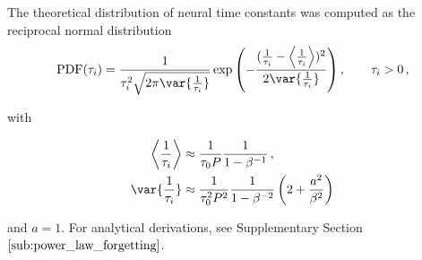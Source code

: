 The theoretical distribution of neural time constants was computed as the reciprocal normal distribution
\begin{equation}
  \text{PDF}(\tau_i) = \frac{1}{\tau_i^2 \sqrt{2\pi \var{\frac{1}{\tau_i}}}} \exp\left( -\frac{(\frac{1}{\tau_i} - \left<\frac{1}{\tau_i}\right>)^2}{2\var{\frac{1}{\tau_i}}} \right), \qquad \tau_i > 0 \,,
\end{equation}

with

\begin{equation}
\begin{aligned}
\left< \frac{1}{\tau_i} \right> &\approx \frac{1}{\tau_0 P} \frac{1}{1-\beta^{-1}} \,, \\
\var{\frac{1}{\tau_i}} &\approx  \frac{1}{\tau_0^2 P^2} \frac{1}{1-\beta^{-2}} \left(2 + \frac{a^2}{\beta^2}\right) \,
\end{aligned}
\end{equation}

and $a=1$. For analytical derivations, see Supplementary Section $\ref{sub:power_law_forgetting}$.

